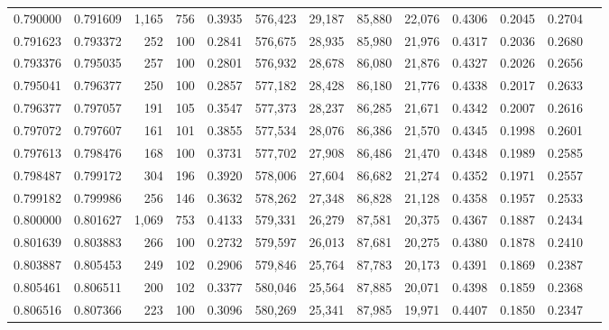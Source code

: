 \begin{tabular}{rrrrrrrrrrrrr}
0.790000 & 0.791609 & 1,165 & 756 &                                     0.3935 & 576,423 &  29,187 &  85,880 &  22,076 & 0.4306 & 0.2045 & 0.2704 \\
0.791623 & 0.793372 &   252 & 100 &                                     0.2841 & 576,675 &  28,935 &  85,980 &  21,976 & 0.4317 & 0.2036 & 0.2680 \\
0.793376 & 0.795035 &   257 & 100 &                                     0.2801 & 576,932 &  28,678 &  86,080 &  21,876 & 0.4327 & 0.2026 & 0.2656 \\
0.795041 & 0.796377 &   250 & 100 &                                     0.2857 & 577,182 &  28,428 &  86,180 &  21,776 & 0.4338 & 0.2017 & 0.2633 \\
0.796377 & 0.797057 &   191 & 105 &                                     0.3547 & 577,373 &  28,237 &  86,285 &  21,671 & 0.4342 & 0.2007 & 0.2616 \\
0.797072 & 0.797607 &   161 & 101 &                                     0.3855 & 577,534 &  28,076 &  86,386 &  21,570 & 0.4345 & 0.1998 & 0.2601 \\
0.797613 & 0.798476 &   168 & 100 &                                     0.3731 & 577,702 &  27,908 &  86,486 &  21,470 & 0.4348 & 0.1989 & 0.2585 \\
0.798487 & 0.799172 &   304 & 196 &                                     0.3920 & 578,006 &  27,604 &  86,682 &  21,274 & 0.4352 & 0.1971 & 0.2557 \\
0.799182 & 0.799986 &   256 & 146 &                                     0.3632 & 578,262 &  27,348 &  86,828 &  21,128 & 0.4358 & 0.1957 & 0.2533 \\
0.800000 & 0.801627 & 1,069 & 753 &                                     0.4133 & 579,331 &  26,279 &  87,581 &  20,375 & 0.4367 & 0.1887 & 0.2434 \\
0.801639 & 0.803883 &   266 & 100 &                                     0.2732 & 579,597 &  26,013 &  87,681 &  20,275 & 0.4380 & 0.1878 & 0.2410 \\
0.803887 & 0.805453 &   249 & 102 &                                     0.2906 & 579,846 &  25,764 &  87,783 &  20,173 & 0.4391 & 0.1869 & 0.2387 \\
0.805461 & 0.806511 &   200 & 102 &                                     0.3377 & 580,046 &  25,564 &  87,885 &  20,071 & 0.4398 & 0.1859 & 0.2368 \\
0.806516 & 0.807366 &   223 & 100 &                                     0.3096 & 580,269 &  25,341 &  87,985 &  19,971 & 0.4407 & 0.1850 & 0.2347 \\

\end{tabular}
